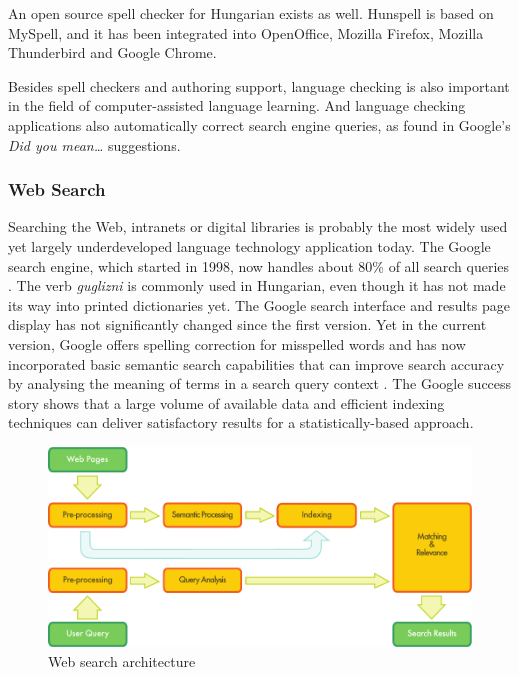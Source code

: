 \begin{multicols}{2}
An open source spell checker for Hungarian exists as well. Hunspell \cite{hunspell} is based on MySpell, and it has been integrated into OpenOffice, Mozilla Firefox, Mozilla Thunderbird and Google Chrome.

Besides spell checkers and authoring support, language checking is also important in the field of computer-assisted language learning. And language checking applications also automatically correct search engine queries, as found in Google's \textit{Did you mean\dots} suggestions.

\subsubsection{Web Search}

Searching the Web, intranets or digital libraries is probably the most widely used yet largely underdeveloped language technology application today. The Google search engine, which started in 1998, now handles about 80\% of all search queries \cite{spi1}. The verb \textit{guglizni} is commonly used in Hungarian, even though it has not made its way into printed dictionaries yet. The Google search interface and results page display has not significantly changed since the first version. Yet in the current version, Google offers spelling correction for misspelled words and has now incorporated basic semantic search capabilities that can improve search accuracy by analysing the meaning of terms in a search query context \cite{pc1}. The Google success story shows that a large volume of available data and efficient indexing techniques can deliver satisfactory results for a statistically-based approach.  

\begin{figure}[htb]
\center
\includegraphics[width=\textwidth]{../_media/english/web_search_architecture}
\caption{Web search architecture}
\label{fig:websearcharch_en}
\end{figure}


\end{multicols}
